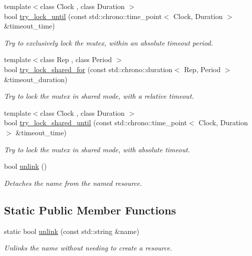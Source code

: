 \begin{DoxyCompactItemize}
{\footnotesize template$<$class Clock , class Duration $>$ }\\bool \hyperlink{classcpen333_1_1process_1_1impl_1_1shared__mutex__fair_ab8acef917db5784868e439a26a72343b}{try\+\_\+lock\+\_\+until} (const std\+::chrono\+::time\+\_\+point$<$ Clock, Duration $>$ \&timeout\+\_\+time)
\begin{DoxyCompactList}\small\item\em Try to exclusively lock the mutex, within an absolute timeout period. \end{DoxyCompactList}\item 
{\footnotesize template$<$class Rep , class Period $>$ }\\bool \hyperlink{classcpen333_1_1process_1_1impl_1_1shared__mutex__fair_a0927a5897a261f5eb992eb442145fdf5}{try\+\_\+lock\+\_\+shared\+\_\+for} (const std\+::chrono\+::duration$<$ Rep, Period $>$ \&timeout\+\_\+duration)
\begin{DoxyCompactList}\small\item\em Try to lock the mutex in shared mode, with a relative timeout. \end{DoxyCompactList}\item 
{\footnotesize template$<$class Clock , class Duration $>$ }\\bool \hyperlink{classcpen333_1_1process_1_1impl_1_1shared__mutex__fair_af45bf5f8271a18b7cf3e737288d38025}{try\+\_\+lock\+\_\+shared\+\_\+until} (const std\+::chrono\+::time\+\_\+point$<$ Clock, Duration $>$ \&timeout\+\_\+time)
\begin{DoxyCompactList}\small\item\em Try to lock the mutex in shared mode, with absolute timeout. \end{DoxyCompactList}\item 
bool \hyperlink{classcpen333_1_1process_1_1impl_1_1shared__mutex__fair_a40e20137e0c27f4a742ab6c5388eb61b}{unlink} ()
\begin{DoxyCompactList}\small\item\em Detaches the name from the named resource. \end{DoxyCompactList}\end{DoxyCompactItemize}
\subsection*{Static Public Member Functions}
\begin{DoxyCompactItemize}
\item 
static bool \hyperlink{classcpen333_1_1process_1_1impl_1_1shared__mutex__fair_a956a4efec20df5852fef56bfd2a22ea2}{unlink} (const std\+::string \&name)
\begin{DoxyCompactList}\small\item\em Unlinks the name without needing to create a resource. \end{DoxyCompactList}\end{DoxyCompactItemize}


